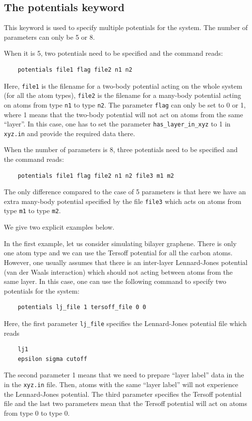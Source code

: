 \documentclass[12pt,a4paper]{report}
\begin{document}
\subsection{The potentials keyword}

This keyword is used to specify multiple potentials for the system. The number of parameters can only be 5 or 8. 

When it is 5, two potentials need to be specified and the command reads:
\begin{verbatim}
    potentials file1 flag file2 n1 n2
\end{verbatim}
Here, \verb"file1" is the filename for a two-body potential acting on the whole system (for all the atom types), \verb"file2" is the filename for a many-body potential acting on atoms from type \verb"n1" to type \verb"n2". The parameter \verb"flag" can only be set to 0 or 1, where 1 means that the two-body potential will not act on atoms from the same ``layer''. In this case, one has to set the parameter \verb"has_layer_in_xyz" to 1 in \verb"xyz.in" and provide the required data there.

When the number of parameters is 8, three potentials need to be specified and the command reads:
\begin{verbatim}
    potentials file1 flag file2 n1 n2 file3 m1 m2
\end{verbatim}
The only difference compared to the case of 5 parameters is that here we have an extra many-body potential specified by the file \verb"file3" which acts on atoms from type \verb"m1" to type \verb"m2".

We give two explicit examples below.

In the first example, let us consider simulating bilayer graphene. There is only one atom type and we can use the Tersoff potential for all the carbon atoms. However, one usually assumes that there is an inter-layer Lennard-Jones potential (van der Waals interaction) which should not acting between atoms from the same layer. In this case, one can use the following command to specify two potentials for the system:
\begin{verbatim}
    potentials lj_file 1 tersoff_file 0 0
\end{verbatim}
Here,  the first parameter \verb"lj_file" specifies the Lennard-Jones potential file which reads 
\begin{verbatim}
    lj1
    epsilon sigma cutoff
\end{verbatim}
The second parameter 1 means that we need to prepare ``layer label'' data in the  in the  \verb"xyz.in" file. Then, atoms with the same ``layer label'' will not experience the Lennard-Jones potential. The third parameter specifies the Tersoff potential file and the last two parameters mean that the Tersoff potential will act on atoms from type 0 to type 0.
\end{document}
